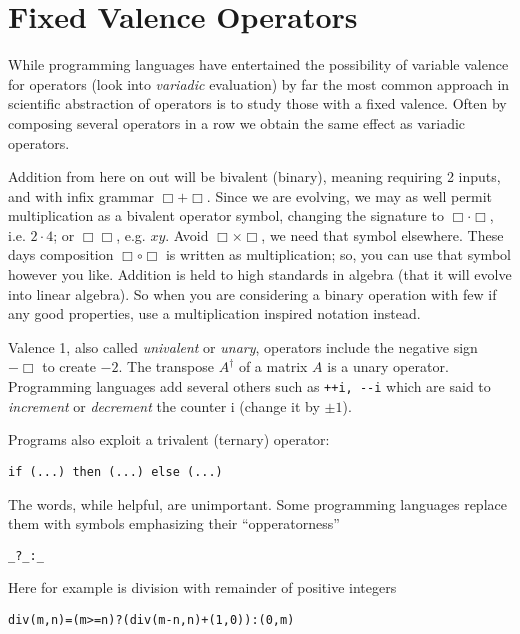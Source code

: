 \section{Fixed Valence Operators}
While programming languages have entertained the possibility of 
variable valence for operators (look into \emph{variadic} evaluation)
by far the most common approach in scientific abstraction of operators 
is to study those with a fixed valence.  Often by composing several 
operators in a row we obtain the same effect as  variadic 
operators.  

Addition from here on out will be bivalent (binary), meaning 
requiring 2 inputs, and with infix grammar $\Box +\Box$.
Since we are evolving, we may as well permit multiplication as a bivalent operator
symbol, changing the signature to $\Box \cdot \Box$, i.e. $2\cdot 4$; or
$\Box\Box$, e.g. $xy$.   Avoid $\Box\times \Box$, we need that symbol elsewhere.
These days composition $\Box\circ\Box$ is written as multiplication; so, you can
use that symbol however you like.  Addition is held to high standards in algebra
(that it will evolve into linear algebra).  So when you are considering a binary
operation with few if any good properties, use a multiplication inspired
notation instead.   




Valence 1, also called \emph{univalent} or \emph{unary}, operators include the negative sign $-\Box$ to create 
$-2$.  The transpose $A^{\dagger}$ of a matrix $A$ is a unary operator.  Programming languages add several others 
such as \lstinline{++i, --i} which are said to \emph{increment} 
or \emph{decrement} the counter i (change it by $\pm 1$).

Programs also exploit a trivalent (ternary) operator:
\begin{center}
    \lstinline[language=Sava]{if (...) then (...) else (...)}
\end{center}
The words, while helpful, are unimportant.  Some programming languages 
replace them with symbols emphasizing their ``opperatorness'' 
\begin{center}
    \lstinline[language=Sava]{_?_:_}
\end{center}
Here for example is division with remainder of positive integers
\begin{center}
\begin{lstlisting}[language=Sava,mathescape]
div(m,n)=(m>=n)?(div(m-n,n)+(1,0)):(0,m)
\end{lstlisting}
\end{center}

